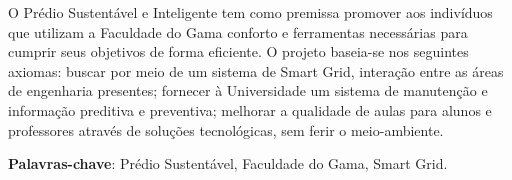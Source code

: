 \begin{resumo}
 O Prédio Sustentável e Inteligente tem como premissa promover aos indivíduos que utilizam a Faculdade do Gama conforto e ferramentas necessárias para cumprir seus objetivos de forma eficiente. O projeto baseia-se nos seguintes axiomas: buscar por meio de um sistema de Smart Grid, interação entre as áreas de engenharia presentes; fornecer à Universidade um sistema de manutenção e informação preditiva e preventiva; melhorar a qualidade de aulas para alunos e professores através de soluções tecnológicas, sem ferir o meio-ambiente.


 \vspace{\onelineskip}
    
 \noindent
 \textbf{Palavras-chave}: Prédio Sustentável, Faculdade do Gama, Smart Grid.
\end{resumo}
